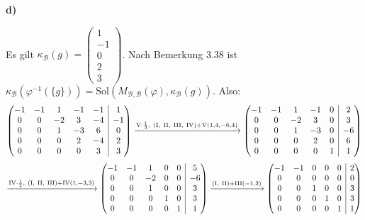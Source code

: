 \documentclass[a4paper,graphics,11pt]{article}
\begin{document}
\textbf{d)}

Es gilt
$   \kappa_{\mathcal{B}}(g)
    = \begin{pmatrix}
        1\\
        -1\\
        0\\
        2\\
        3
    \end{pmatrix}
$.
Nach Bemerkung 3.38 ist
$\kappa_{\mathcal{B}}(\varphi^{-1}(\{g\}))
= \text{Sol}(M_{\mathcal{B}, \mathcal{B}}(\varphi), \kappa_{\mathcal{B}}(g))$. Also:
$$
    \begin{array}({@{}ccccc|c@{}})
        -1 & -1 & 1 & -1 & -1 & 1\\
        0 & 0 & -2 & 3 & -4 & -1\\
        0 & 0 & 1 & -3 & 6 & 0\\
        0 & 0 & 0 & 2 & -4 & 2\\
        0 & 0 & 0 & 0 & 3 & 3\\
    \end{array}
    \xrightarrow {\text{V}\cdot \frac{1}{3},\ (\text{I},\ \text{II},\ \text{III},\ \text{IV}) + \text{V}(1,4,-6,4)}
    \begin{array}({@{}ccccc|c@{}})
        -1 & -1 & 1 & -1 & 0 & 2\\
        0 & 0 & -2 & 3 & 0 & 3\\
        0 & 0 & 1 & -3 & 0 & -6\\
        0 & 0 & 0 & 2 & 0 & 6\\
        0 & 0 & 0 & 0 & 1 & 1\\
    \end{array}
$$$$
    \xrightarrow {\text{IV}\cdot \frac{1}{2},\ (\text{I},\ \text{II},\ \text{III}) + \text{IV}(1,-3,3)}
    \begin{array}({@{}ccccc|c@{}})
        -1 & -1 & 1 & 0 & 0 & 5\\
        0 & 0 & -2 & 0 & 0 & -6\\
        0 & 0 & 1 & 0 & 0 & 3\\
        0 & 0 & 0 & 1 & 0 & 3\\
        0 & 0 & 0 & 0 & 1 & 1\\
    \end{array}
    \xrightarrow {(\text{I},\ \text{II}) + \text{III}(-1, 2)}
    \begin{array}({@{}ccccc|c@{}})
        -1 & -1 & 0 & 0 & 0 & 2\\
        0 & 0 & 0 & 0 & 0 & 0\\
        0 & 0 & 1 & 0 & 0 & 3\\
        0 & 0 & 0 & 1 & 0 & 3\\
        0 & 0 & 0 & 0 & 1 & 1\\
    \end{array}
$$
\end{document}
